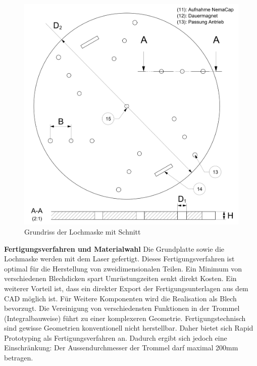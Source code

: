 	\begin{figure}[H]
	\includegraphics[scale=0.63]{Illustrationen/6-Umsetzung/detail_lochmaske.jpg}
	\caption{Grundriss der Lochmaske mit Schnitt}
	\label{fig:detail_lochmaske}
	\end{figure}
\textbf{Fertigungsverfahren und Materialwahl}
\newline
 Die Grundplatte sowie die Lochmaske werden mit dem Laser gefertigt. Dieses Fertigungsverfahren ist optimal für die Herstellung von zweidimensionalen Teilen. Ein Minimum von verschiedenen Blechdicken spart Umrüstungzeiten senkt direkt Kosten. Ein weiterer Vorteil ist, dass ein direkter Export der Fertigungsunterlagen aus dem CAD möglich ist. Für Weitere Komponenten wird die Realisation als Blech bevorzugt.
\newline
\newline
Die Vereinigung von verschiedensten Funktionen in der Trommel (Integralbauweise) führt zu einer komplexeren Geometrie. Fertigungstechnisch sind gewisse Geometrien konventionell nicht herstellbar. Daher bietet sich Rapid Prototyping als Fertigungsverfahren an. Dadurch ergibt sich jedoch eine Einschränkung: Der Aussendurchmesser der Trommel darf maximal 200mm betragen. 